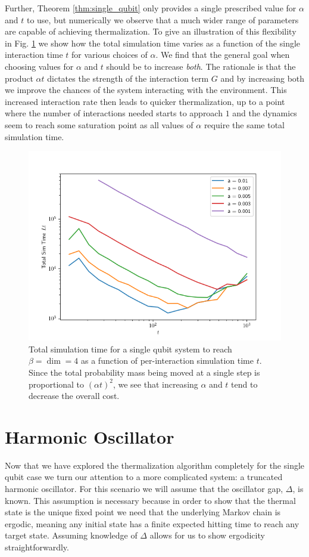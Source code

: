 \documentclass{article}
\begin{document}
 Further, Theorem \ref{thm:single_qubit} only provides a single prescribed value for $\alpha$ and $t$ to use, but numerically we observe that a much wider range of parameters are capable of achieving thermalization. To give an illustration of this flexibility in Fig. \ref{fig:tot_time_vs_single_time} we show how the total simulation time varies as a function of the single interaction time $t$ for various choices of $\alpha$. We find that the general goal when choosing values for $\alpha$ and $t$ should be to increase \emph{both}. The rationale is that the product $\alpha t$ dictates the strength of the interaction term $G$ and by increasing both we improve the chances of the system interacting with the environment. This increased interaction rate then leads to quicker thermalization, up to a point where the number of interactions needed starts to approach $1$ and the dynamics seem to reach some saturation point as all values of $\alpha$ require the same total simulation time.


\begin{figure} 
    \centering
    \includegraphics[width=0.75\linewidth]{numerics/data/total_time_vs_time.png}
    \caption{Total simulation time for a single qubit system to reach $\beta = \dim = 4$ as a function of per-interaction simulation time $t$. Since the total probability mass being moved at a single step is proportional to $(\alpha t)^2$, we see that increasing $\alpha$ and $t$ tend to decrease the overall cost.}\label{fig:tot_time_vs_single_time}
\end{figure}

\section{Harmonic Oscillator}
Now that we have explored the thermalization algorithm completely for the single qubit case we turn our attention to a more complicated system: a truncated harmonic oscillator. For this scenario we will assume that the oscillator gap, $\Delta$, is known. This assumption is necessary because in order to show that the thermal state is the unique fixed point we need that the underlying Markov chain is ergodic, meaning any initial state has a finite expected hitting time to reach any target state. Assuming knowledge of $\Delta$ allows for us to show ergodicity straightforwardly.
\end{document}
